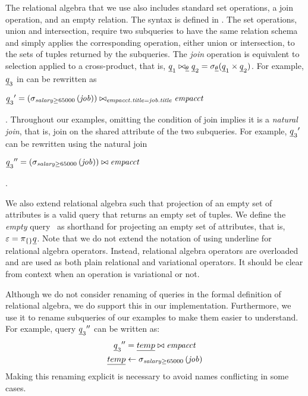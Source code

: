 

The relational algebra that we use also includes standard set operations, a join 
operation, and an empty relation. The syntax is defined in .
%
The set operations, union and intersection, require two subqueries to have the same relation schema
and simply applies the corresponding operation, either union or intersection, to the sets of tuples returned by
the subqueries.
%
The \emph{join} operation is equivalent to selection applied to a cross-product, that is,
$\pQ_1 \bowtie_{\pCond} \pQ_2 = \vSel [\pCond] {(\pQ_1 \times \pQ_2)}$.
For example, ${\pQ_3}$ in  can be rewritten as\\
\centerline{
\ensuremath{
\VVal {{\pQ_3}} = \left(\sigma_{\salary \ge 65000} \left(\job\right)\right) \bowtie_{\empacct.\titleatt=\job.\titleatt} \empacct
}}.
\noindent
Throughout our examples, omitting the condition of join  implies it is a \emph{natural join},
that is, join on the shared attribute of the two subqueries.
For example, $\VVal {{\pQ_3}}$ can be rewritten using the natural join\\
\centerline{
\ensuremath{
\VVVal {{\pQ_3}} =  \left(\sigma_{\salary \ge 65000} \left(\job\right)\right) \bowtie \empacct
}}.



We also extend relational algebra such that projection of an empty set of
attributes is a valid query that returns an empty set of tuples. We define the
\emph{empty} query \empPRel\ as shorthand for projecting an empty set of
attributes, that is, $\empPRel = \pi_{\{\}} \pQ$.
%
Note that we do not extend the notation of using underline for relational algebra
operators. Instead, relational algebra operators are overloaded and are used
as both plain relational and variational operators. It should be clear from
context when an operation is variational or not. 


Although we do not consider renaming of queries in the formal definition of 
relational algebra, we do support this in our implementation. Furthermore, we use it
to rename subqueries of our examples to make them easier to understand. 
For example, query $\VVVal {{\pQ_3}}$ can be written as:
\begin{align*}
\VVVal {{\pQ_3}} &= \underline{temp} \bowtie \empacct\\
\underline{temp} &\leftarrow  \sigma_{\salary \ge 65000} \left(\job\right)
\end{align*}
\noindent
Making this renaming explicit is necessary to avoid names conflicting in some cases.




